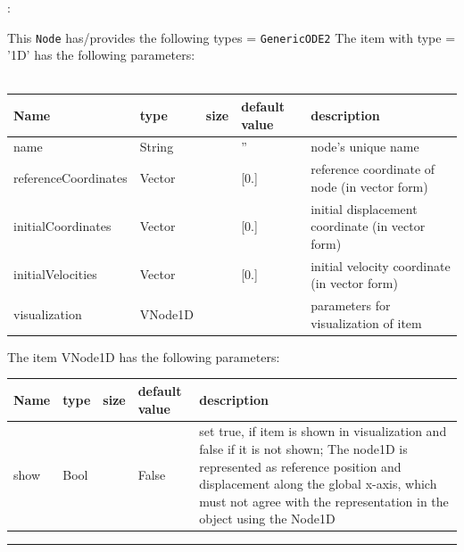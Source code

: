 \noindent {}:
\bi
  \item This \texttt{Node} has/provides the following types = \texttt{GenericODE2}
\ei\vspace{12pt} \noindent 
The item  with type = '1D' has the following parameters:
\vspace{-0.5cm}\\
\vspace{-0.5cm}\\
\begin{center}
  \footnotesize
  \begin{longtable}{| p{4.5cm} | p{2.5cm} | p{0.5cm} | p{2.5cm} | p{6cm} |}
    \hline
    \bf Name & \bf type & \bf size & \bf default value & \bf description \\ \hline
    name &     String &      &     '' &     node's unique name\\ \hline
    referenceCoordinates &     Vector &      &     [0.] &     reference coordinate of node (in vector form)\\ \hline
    initialCoordinates &     Vector &      &     [0.] &     initial displacement coordinate (in vector form)\\ \hline
    initialVelocities &     Vector &      &     [0.] &     initial velocity coordinate (in vector form)\\ \hline
    visualization &     VNode1D &      &      &     parameters for visualization of item\\ \hline
\end{longtable}
\end{center}

\noindent The item VNode1D has the following parameters:
\begin{center}
  \footnotesize
  \begin{longtable}{| p{4.5cm} | p{2.5cm} | p{0.5cm} | p{2.5cm} | p{6cm} |}
    \hline
    \bf Name & \bf type & \bf size & \bf default value & \bf description \\ \hline
    show &     Bool &      &     False &     set true, if item is shown in visualization and false if it is not shown; The node1D is represented as reference position and displacement along the global x-axis, which must not agree with the representation in the object using the Node1D\\ \hline
\end{longtable}
\end{center}
\par\noindent\rule{\textwidth}{0.4pt}
\label{description_Node1D}
